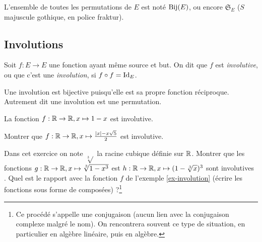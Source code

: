 L'ensemble de toutes les permutations de $E$ est noté $\operatorname{Bij}(E)$, ou encore $\mathfrak S_E$ ($S$  majuscule gothique, en police fraktur).

\subsection{Involutions}
\begin{definition}
Soit $f : E\to E$ une fonction ayant même source et but. On dit que $f$ est \emph{involutive}, ou que c'est une \emph{involution}, si $f\circ f=\operatorname{Id}_E$.
\end{definition}

\begin{remarque}
Une involution est bijective puisqu'elle est sa propre fonction réciproque. Autrement dit une involution est une permutation.
\end{remarque}

\begin{exemple}\label{ex-involution}
La fonction $f : \mathbb{R}\to \mathbb{R}, x\mapsto 1-x$ est involutive.
\end{exemple}

\begin{exercice}
Montrer que $f : \mathbb{R}\to \mathbb{R}, x\mapsto \frac{|x|-x\sqrt 5}{2}$ est involutive.
\end{exercice}

\begin{exercice}
Dans cet exercice on note $\sqrt[3]{}$ la racine cubique définie sur $\mathbb{R}$.
Montrer que les fonctions $g : \mathbb{R}\to \mathbb{R}, x\mapsto \sqrt[3]{1-x^3}$ est $h : \mathbb{R}\to \mathbb{R}, x\mapsto (1-\sqrt[3]{x})^3$ sont involutives . Quel est le rapport avec la fonction $f$ de l'exemple \ref{ex-involution} (écrire les fonctions sous forme de composées) ?\footnote{Ce procédé s'appelle une \og conjugaison\fg{} (aucun lien avec la conjugaison complexe malgré le nom). On rencontrera souvent ce type de situation, en particulier en algèbre linéaire, puis en algèbre.}
\end{exercice}



